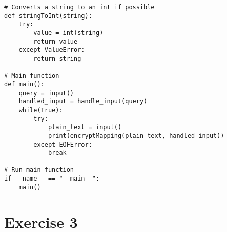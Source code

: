\documentclass{report}
\begin{document}
\begin{lstlisting}
# Converts a string to an int if possible
def stringToInt(string):
    try:
        value = int(string)
        return value
    except ValueError:
        return string

# Main function
def main():
    query = input()
    handled_input = handle_input(query)
    while(True):
        try:
            plain_text = input()
            print(encryptMapping(plain_text, handled_input))
        except EOFError:
            break

# Run main function
if __name__ == "__main__":
    main()

\end{lstlisting}

\section*{Exercise 3}
\end{document}
